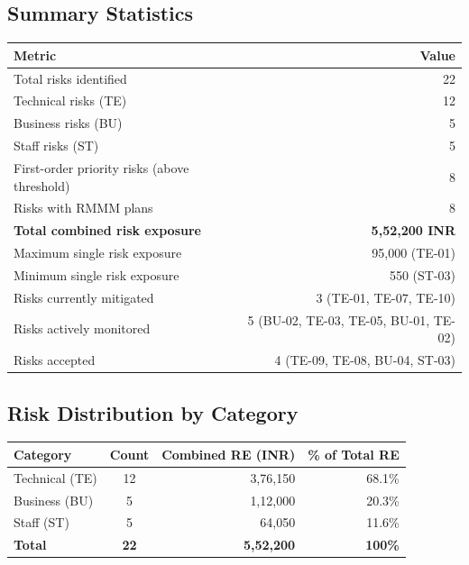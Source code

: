 \documentclass[11pt, a4paper]{article}
\begin{document}
\newpage

\subsection{Summary Statistics}

\begin{center}
\begin{tabular}{|p{6.5cm}|r|}
\hline
\rowcolor{primary!10}
\textbf{Metric} & \textbf{Value} \\
\hline
Total risks identified & 22 \\
\hline
Technical risks (TE) & 12 \\
\hline
Business risks (BU) & 5 \\
\hline
Staff risks (ST) & 5 \\
\hline
First-order priority risks (above threshold) & 8 \\
\hline
Risks with RMMM plans & 8 \\
\hline
\textbf{Total combined risk exposure} & \textbf{5,52,200 INR} \\
\hline
Maximum single risk exposure & 95,000 (TE-01) \\
\hline
Minimum single risk exposure & 550 (ST-03) \\
\hline
Risks currently mitigated & 3 (TE-01, TE-07, TE-10) \\
\hline
Risks actively monitored & 5 (BU-02, TE-03, TE-05, BU-01, TE-02) \\
\hline
Risks accepted & 4 (TE-09, TE-08, BU-04, ST-03) \\
\hline
\end{tabular}
\end{center}

\subsection{Risk Distribution by Category}

\begin{center}
\begin{tabular}{|l|c|r|r|}
\hline
\rowcolor{primary!10}
\textbf{Category} & \textbf{Count} & \textbf{Combined RE (INR)} & \textbf{\% of Total RE} \\
\hline
Technical (TE) & 12 & 3,76,150 & 68.1\% \\
\hline
Business (BU) & 5 & 1,12,000 & 20.3\% \\
\hline
Staff (ST) & 5 & 64,050 & 11.6\% \\
\hline
\textbf{Total} & \textbf{22} & \textbf{5,52,200} & \textbf{100\%} \\
\hline
\end{tabular}
\end{center}
\end{document}
